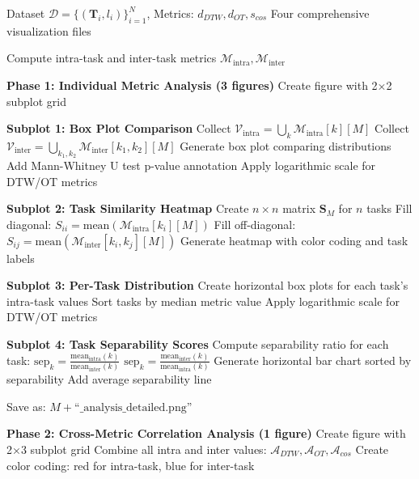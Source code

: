 \documentclass{article}
\begin{document}
\begin{algorithm}[H]
\caption{Multi-Metric Trajectory Visualization and Analysis}
\label{alg:trajectory_visualization}
\begin{algorithmic}[1]
\REQUIRE Dataset $\mathcal{D} = \{(\mathbf{T}_i, l_i)\}_{i=1}^N$, Metrics: $d_{DTW}, d_{OT}, s_{cos}$
\ENSURE Four comprehensive visualization files

\STATE Compute intra-task and inter-task metrics $\mathcal{M}_{\text{intra}}, \mathcal{M}_{\text{inter}}$

\STATE \textbf{Phase 1: Individual Metric Analysis (3 figures)}
    \STATE Create figure with 2×2 subplot grid
    
    \STATE \textbf{Subplot 1: Box Plot Comparison}
    \STATE Collect $\mathcal{V}_{\text{intra}} = \bigcup_k \mathcal{M}_{\text{intra}}[k][M]$
    \STATE Collect $\mathcal{V}_{\text{inter}} = \bigcup_{k_1,k_2} \mathcal{M}_{\text{inter}}[k_1,k_2][M]$
    \STATE Generate box plot comparing distributions
    \STATE Add Mann-Whitney U test p-value annotation
    \STATE Apply logarithmic scale for DTW/OT metrics
    
    \STATE \textbf{Subplot 2: Task Similarity Heatmap}
    \STATE Create $n \times n$ matrix $\mathbf{S}_M$ for $n$ tasks
    \STATE Fill diagonal: $S_{ii} = \text{mean}(\mathcal{M}_{\text{intra}}[k_i][M])$
    \STATE Fill off-diagonal: $S_{ij} = \text{mean}(\mathcal{M}_{\text{inter}}[k_i,k_j][M])$
    \STATE Generate heatmap with color coding and task labels
    
    \STATE \textbf{Subplot 3: Per-Task Distribution}
    \STATE Create horizontal box plots for each task's intra-task values
    \STATE Sort tasks by median metric value
    \STATE Apply logarithmic scale for DTW/OT metrics
    
    \STATE \textbf{Subplot 4: Task Separability Scores}
    \STATE Compute separability ratio for each task:
        \STATE $\text{sep}_k = \frac{\text{mean}_{\text{intra}}(k)}{\text{mean}_{\text{inter}}(k)}$
    \ELSE
        \STATE $\text{sep}_k = \frac{\text{mean}_{\text{inter}}(k)}{\text{mean}_{\text{intra}}(k)}$
    \ENDIF
    \STATE Generate horizontal bar chart sorted by separability
    \STATE Add average separability line
    
    \STATE Save as: $M + \text{``\_analysis\_detailed.png''}$
\ENDFOR

\STATE \textbf{Phase 2: Cross-Metric Correlation Analysis (1 figure)}
\STATE Create figure with 2×3 subplot grid
\STATE Combine all intra and inter values: $\mathcal{A}_{DTW}, \mathcal{A}_{OT}, \mathcal{A}_{cos}$
\STATE Create color coding: red for intra-task, blue for inter-task


\end{algorithmic}
\end{algorithm}
\end{document}
